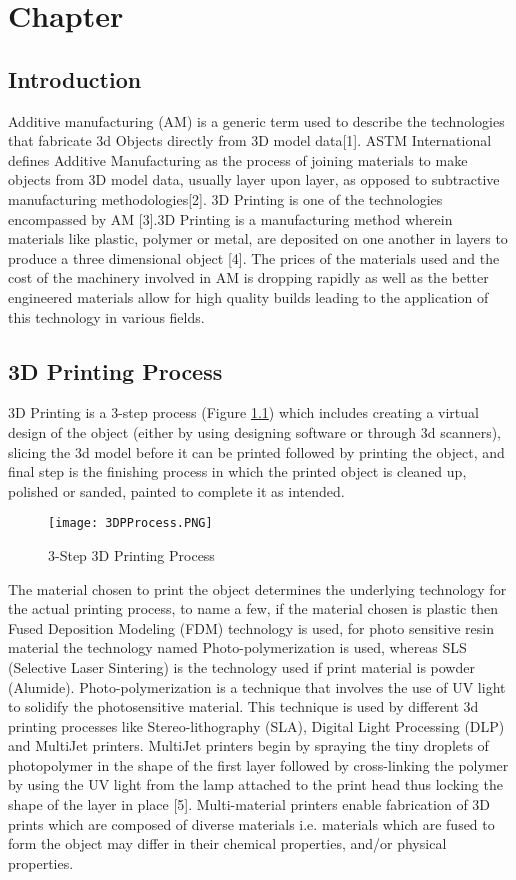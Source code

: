\chapter{Chapter}
\section{Introduction}
Additive manufacturing (AM) is a generic term used to describe the technologies that fabricate 3d Objects directly from 3D model data[1]. ASTM International defines Additive Manufacturing as the process of joining materials to make objects from 3D model data, usually layer upon layer, as opposed to subtractive manufacturing methodologies[2]. 3D Printing is one of the technologies encompassed by AM [3].3D Printing is a manufacturing method  wherein materials like plastic, polymer or metal, are deposited on one another in layers to produce a three dimensional object [4].  The prices of the materials used and the cost of the machinery involved in AM is dropping rapidly as well as the better engineered materials allow for high quality builds leading to the application of this technology in various fields. 

\section{3D Printing Process}

3D Printing is a 3-step process (Figure \ref{fig:3DP}) which includes creating a virtual design of the object (either by using designing software or through 3d scanners), slicing the 3d model before it can be printed followed by printing the object, and final step is the finishing process in which the printed object is cleaned up, polished or sanded, painted to complete it as intended.  
\begin{figure}[ht!]
\centering
\texttt{[image: 3DPProcess.PNG]}
\caption{3-Step 3D Printing Process}
\label{fig:3DP}
\end{figure}

The material chosen to print the object determines the underlying technology for the actual printing process, to name a few, if the material chosen is plastic then Fused Deposition Modeling (FDM) technology is used, for photo sensitive resin material the technology named Photo-polymerization is used, whereas SLS (Selective Laser Sintering) is the technology used if print material is powder (Alumide). Photo-polymerization is a technique that involves the use of UV light to solidify the photosensitive material.  This technique is used by different 3d printing processes like Stereo-lithography (SLA), Digital Light Processing (DLP) and MultiJet printers.  MultiJet printers begin by spraying the tiny droplets of photopolymer in the shape of the first layer followed by cross-linking the polymer by using the UV light from the lamp attached to the print head thus locking the shape of the layer in place [5]. Multi-material printers enable fabrication of 3D prints which are composed of diverse materials i.e. materials which are fused to form the object may differ in their chemical properties, and/or physical properties. 

